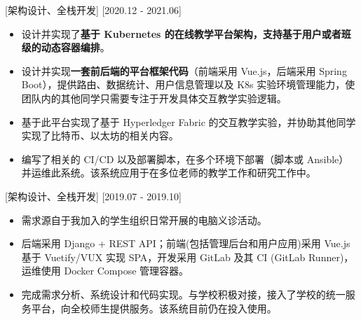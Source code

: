 \documentclass{resume}
\begin{document}
[架构设计、全栈开发]
[2020.12 - 2021.06] 

\begin{itemize}
  \item 设计并实现了\textbf{基于 Kubernetes 的在线教学平台架构，支持基于用户或者班级的动态容器编排}。
  \item 设计并实现\textbf{一套前后端的平台框架代码}（前端采用 Vue.js，后端采用 Spring Boot），提供路由、数据统计、用户信息管理以及 K8s 实验环境管理能力，使团队内的其他同学只需要专注于开发具体交互教学实验逻辑。
  \item 基于此平台实现了基于 Hyperledger Fabric 的交互教学实验，并协助其他同学实现了比特币、以太坊的相关内容。
  \item 编写了相关的 CI/CD 以及部署脚本，在多个环境下部署（脚本或 Ansible）并运维此系统。该系统应用于在多位老师的教学工作和研究工作中。
\end{itemize}

[架构设计、全栈开发]
[2019.07 - 2019.10] 

\begin{itemize}
  \item 需求源自于我加入的学生组织日常开展的电脑义诊活动。
  \item 后端采用 Django + REST API；前端(包括管理后台和用户应用)采用 Vue.js 基于 Vuetify/VUX 实现 SPA，开发采用 GitLab 及其 CI (GitLab Runner)，运维使用 Docker Compose 管理容器。
  \item 完成需求分析、系统设计和代码实现。与学校积极对接，接入了学校的统一服务平台，向全校师生提供服务。该系统目前仍在投入使用。
\end{itemize}
\end{document}
